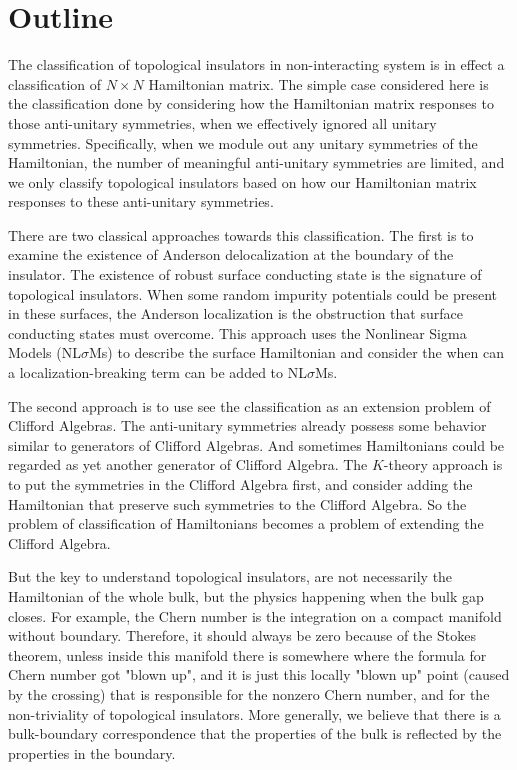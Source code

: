 \section{Outline}
\label{sec:Outline}
 
The classification of topological insulators in non-interacting system is in
effect a classification of $N\times N$ Hamiltonian matrix. %
The simple case considered here
is the classification done by considering how the Hamiltonian matrix responses
to those anti-unitary symmetries, when we effectively ignored all unitary
symmetries. Specifically, when we module out any unitary symmetries of the
Hamiltonian, the number of meaningful anti-unitary symmetries are limited, and
we only classify topological insulators based on how our Hamiltonian matrix
responses to these anti-unitary symmetries.

There are two classical approaches towards this classification. The first
\cite{Schnyder2008} is to examine the existence of Anderson delocalization at
the boundary of the insulator. The existence of robust surface conducting state
is the signature of topological insulators. When some random impurity potentials
could be present in these surfaces, the Anderson localization is the obstruction
that surface conducting states must overcome. This approach uses the Nonlinear
Sigma Models (NL$\sigma$Ms) to describe the surface Hamiltonian and consider the
when can a localization-breaking term can be added to NL$\sigma$Ms.

The second approach\cite{Kitaev2009a} is to use see the classification as an
extension problem of Clifford Algebras. The anti-unitary symmetries already
possess some behavior similar to generators of Clifford Algebras. And sometimes
Hamiltonians could be regarded as yet another generator of Clifford
Algebra\cite{Morimoto2013}. The $K$-theory approach is to put the symmetries in
the Clifford Algebra first, and consider adding the Hamiltonian that preserve
such symmetries to the Clifford Algebra. So the problem of classification of
Hamiltonians becomes a problem of extending the Clifford Algebra.

But the key to understand topological insulators, are not necessarily the
Hamiltonian of the whole bulk, but the physics happening when the bulk gap
closes. For example, the Chern number is the integration on a compact manifold
without boundary. Therefore, it should always be zero because of the Stokes
theorem, unless inside this manifold there is somewhere where the formula for
Chern number got "blown up", and it is just this locally "blown up" point
(caused by the crossing) that is responsible for the nonzero Chern number, and
for the non-triviality of topological insulators. More generally, we believe
that there is a bulk-boundary correspondence that the properties of the bulk is
reflected by the properties in the boundary.

